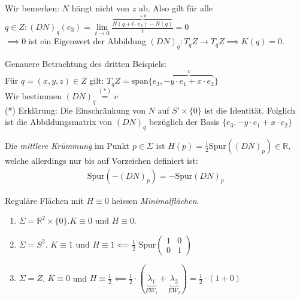 \documentclass[../main.tex]{subfiles}
\begin{document}
\begin{example}
\begin{enumerate}
        Wir bemerken: $N$ hängt nicht von $z$ ab. 
        Also gilt für alle $q \in Z : (DN)_{q}(e_{3}) = \lim\limits_{t \rightarrow 0}{\frac{\overbrace{N(q + t \cdot e_{3}) - N(q)}^{=0}}{t}} = 0$\\
        $\implies 0$ ist ein Eigenwert der Abbildung $(DN)_{q} : T_{q}Z \to T_{q}Z \implies K(q) = 0$.
    \end{enumerate}
    \begin{zusatz}
        Genauere Betrachtung des dritten Beispiels:\\
        Für $q = (x,y,z) \in Z$ gilt: $T_{q}Z = \text{span}\{e_{3}, \overbrace{-y \cdot e_{1} + x \cdot e_{2}}^{v}\}$\\
        Wir bestimmen $(DN)_{q}\stackrel{(\text{*})}{=} v$\\
        (*) Erklärung: Die Einschränkung von $N$ auf $S'\times \{0\}$ ist die Identität. Folglich ist die Abbildungsmatrix von $(DN)_{q}$ bezüglich der Basis $\{ e_{3}, -y \cdot e_{1} + x \cdot e_{2} \}$
    \end{zusatz}
\end{example}
\begin{definition}
    Die \emph{mittlere Krümmung} im Punkt $p \in \Sigma$ ist $H(p) = \frac{1}{2} \text{Spur}((DN)_{p})\in \mathbb{R}$, welche allerdings nur bis auf Vorzeichen definiert ist:
    \begin{align*}
        \text{Spur}(-(DN)_{p}) = - \text{Spur}(DN)_{p}
    \end{align*}

\end{definition}
\begin{remark}
    Reguläre Flächen mit $H \equiv 0$ heissen \emph{Minimalflächen}.
\end{remark}
\begin{examples}
    \begin{enumerate}
       \item $\Sigma = \mathbb{R}^{2} \times \{0\}. K\equiv 0 \text{ und } H\equiv 0$.
       \item $\Sigma = S^{2}$. $K \equiv 1 \text{ und } H\equiv 1 \impliedby \frac{1}{2}\text{ Spur}\begin{pmatrix}
           1 & 0 \\
           0 & 1
       \end{pmatrix}$
       \item $\Sigma = Z$. $K\equiv 0$ und $H\equiv \frac{1}{2} \impliedby \frac{1}{2} \cdot (\underbrace{\lambda_{1}}_{EW_{1}} + \underbrace{\lambda_{2}}_{EW_{2}}) = \frac{1}{2} \cdot (1 + 0)$ 
    \end{enumerate}
\end{examples}
\end{document}
